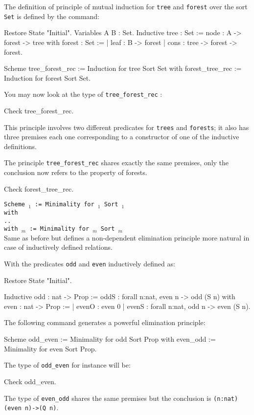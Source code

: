 \Example
The definition of principle of mutual induction for {\tt tree} and
{\tt forest} over the sort {\tt Set} is defined by the command:
\begin{coq_eval}
Restore State "Initial".
Variables A B : Set.
Inductive tree : Set :=
    node : A -> forest -> tree
with forest : Set :=
  | leaf : B -> forest
  | cons : tree -> forest -> forest.
\end{coq_eval}
\begin{coq_example*}
Scheme tree_forest_rec := Induction for tree
  Sort Set
  with forest_tree_rec := Induction for forest Sort Set.
\end{coq_example*}
You may now look at the type of {\tt tree\_forest\_rec} :
\begin{coq_example}
Check tree_forest_rec.
\end{coq_example}
This principle involves two different predicates for {\tt trees} and
{\tt forests}; it also has three premises each one corresponding to a
constructor of one of the inductive definitions.

The principle {\tt tree\_forest\_rec} shares exactly the same
premises, only the conclusion now refers to the property of forests.
\begin{coq_example}
Check forest_tree_rec.
\end{coq_example}

\begin{Variant}
\item {\tt Scheme {\ident$_1$} := Minimality for \term$_1$ Sort {\sort$_1$} \\
  with\\
  \mbox{}\hspace{0.1cm} .. \\
        with {\ident$_m$} := Minimality for {\term$_m$} Sort
        {\sort$_m$}}\\
Same as before but defines a non-dependent elimination principle more
natural in case of inductively defined relations. 
\end{Variant}

\Example
With the predicates {\tt odd} and {\tt even} inductively defined as:
\begin{coq_eval}
Restore State "Initial".
\end{coq_eval}
\begin{coq_example*}
Inductive odd : nat -> Prop :=
    oddS : forall n:nat, even n -> odd (S n)
with even : nat -> Prop :=
  | evenO : even 0%
  | evenS : forall n:nat, odd n -> even (S n).
\end{coq_example*}
The following command generates a powerful elimination
principle:
\begin{coq_example*}
Scheme odd_even := Minimality for   odd Sort Prop
  with even_odd := Minimality for even Sort Prop.
\end{coq_example*}
The type of {\tt odd\_even} for instance will be:
\begin{coq_example}
Check odd_even.
\end{coq_example}
The type of {\tt even\_odd} shares the same premises but the
conclusion is {\tt (n:nat)(even n)->(Q n)}.

